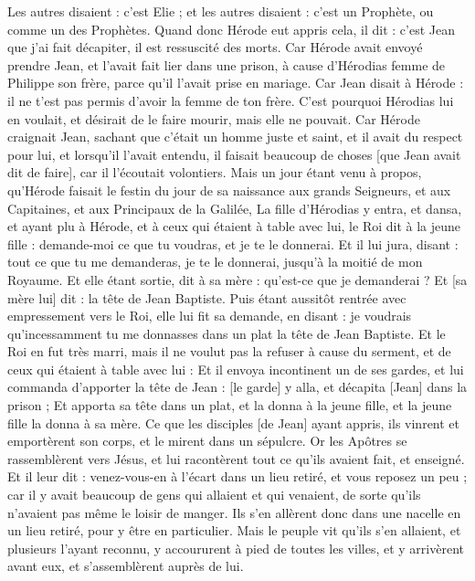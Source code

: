 \begin{multicols}{2}
Les autres disaient : c'est Elie ; et les autres disaient : c'est un Prophète, ou comme un des Prophètes.
Quand donc Hérode eut appris cela, il dit : c'est Jean que j'ai fait décapiter, il est ressuscité des morts.
Car Hérode avait envoyé prendre Jean, et l'avait fait lier dans une prison, à cause d'Hérodias femme de Philippe son frère, parce qu'il l'avait prise en mariage.
Car Jean disait à Hérode : il ne t'est pas permis d'avoir la femme de ton frère.
C'est pourquoi Hérodias lui en voulait, et désirait de le faire mourir, mais elle ne pouvait.
Car Hérode craignait Jean, sachant que c'était un homme juste et saint, et il avait du respect pour lui, et lorsqu'il l'avait entendu, il faisait beaucoup de choses [que Jean avait dit de faire], car il l’écoutait volontiers.
Mais un jour étant venu à propos, qu'Hérode faisait le festin du jour de sa naissance aux grands Seigneurs, et aux Capitaines, et aux Principaux de la Galilée,
La fille d'Hérodias y entra, et dansa, et ayant plu à Hérode, et à ceux qui étaient à table avec lui, le Roi dit à la jeune fille : demande-moi ce que tu voudras, et je te le donnerai.
Et il lui jura, disant : tout ce que tu me demanderas, je te le donnerai, jusqu'à la moitié de mon Royaume.
Et elle étant sortie, dit à sa mère : qu'est-ce que je demanderai ? Et [sa mère lui] dit : la tête de Jean Baptiste.
Puis étant aussitôt rentrée avec empressement vers le Roi, elle lui fit sa demande, en disant : je voudrais qu'incessamment tu me donnasses dans un plat la tête de Jean Baptiste.
Et le Roi en fut très marri, mais il ne voulut pas la refuser à cause du serment, et de ceux qui étaient à table avec lui :
Et il envoya incontinent un de ses gardes, et lui commanda d'apporter la tête de Jean : [le garde] y alla, et décapita [Jean] dans la prison ;
Et apporta sa tête dans un plat, et la donna à la jeune fille, et la jeune fille la donna à sa mère.
Ce que les disciples [de Jean] ayant appris, ils vinrent et emportèrent son corps, et le mirent dans un sépulcre.
Or les Apôtres se rassemblèrent vers Jésus, et lui racontèrent tout ce qu'ils avaient fait, et enseigné.
Et il leur dit : venez-vous-en à l'écart dans un lieu retiré, et vous reposez un peu ; car il y avait beaucoup de gens qui allaient et qui venaient, de sorte qu'ils n'avaient pas même le loisir de manger.
Ils s'en allèrent donc dans une nacelle en un lieu retiré, pour y être en particulier.
Mais le peuple vit qu'ils s'en allaient, et plusieurs l'ayant reconnu, y accoururent à pied de toutes les villes, et y arrivèrent avant eux, et s'assemblèrent auprès de lui.

\end{multicols}
